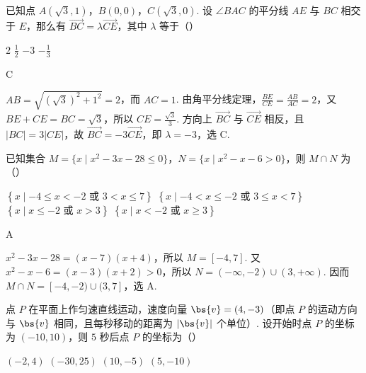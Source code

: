 \begin{problem}
已知点 \(A(\sqrt{3}, 1)\)，\(B(0, 0)\)，\(C(\sqrt{3}, 0)\). 设 \(\angle BAC\) 的平分线 \(AE\) 与 \(BC\) 相交于 \(E\)，那么有 \(\overrightarrow{BC} = \lambda \overrightarrow{CE}\)，其中 \(\lambda\) 等于（\quad）

\choices
    {\(2\)}
    {\(\frac{1}{2}\)}
    {\(-3\)}
    {\(-\frac{1}{3}\)}
\end{problem}

\begin{answer}
C
\end{answer}

\begin{solution}
\(AB=\sqrt{(\sqrt{3})^2+1^2}=2\)，而 \(AC=1\). 由角平分线定理，\(\frac{BE}{CE}=\frac{AB}{AC}=2\)，又 \(BE+CE=BC=\sqrt{3}\)，所以 \(CE=\frac{\sqrt{3}}{3}\). 方向上 \(\overrightarrow{BC}\) 与 \(\overrightarrow{CE}\) 相反，且 \(\lvert BC\rvert=3\lvert CE\rvert\)，故 \(\overrightarrow{BC}=-3\overrightarrow{CE}\)，即 \(\lambda=-3\)，选 C.
\end{solution}

\begin{problem}
已知集合 \(M = \{x \mid x^2 - 3x - 28 \leqslant 0\}\)，\(N = \{x \mid x^2 - x - 6 > 0\}\)，则 \(M \cap N\) 为（\quad）

\choices
    {\(\left\{x\mid -4\leqslant x < -2\text{\ 或\ }3 < x\leqslant 7\right\}\)}
    {\(\left\{x\mid -4 < x\leqslant -2\text{\ 或\ }3\leqslant x < 7\right\}\)}
    {\(\left\{x\mid x\leqslant -2\text{\ 或\ }x > 3\right\}\)}
   {\(\left\{x\mid x < -2\text{\ 或\ }x\geqslant 3\right\}\)}
\end{problem}

\begin{answer}
A
\end{answer}

\begin{solution}
\(x^2-3x-28=(x-7)(x+4)\)，所以 \(M=[-4,7]\). 又 \(x^2-x-6=(x-3)(x+2)>0\)，所以 \(N=(-\infty,-2)\cup(3,+\infty)\). 因而 \(M\cap N=[-4,-2)\cup(3,7]\)，选 A.
\end{solution}

\begin{problem}
点 \(P\) 在平面上作匀速直线运动，速度向量 \(\bs{v}=(4,-3)\)（即点 \(P\) 的运动方向与 \(\bs{v}\) 相同，且每秒移动的距离为 \(|\bs{v}|\) 个单位）. 设开始时点 \(P\) 的坐标为 \((-10,10)\)，则 \(5\) 秒后点 \(P\) 的坐标为（\quad）

\choices
    {\((-2, 4)\)}
    {\((-30, 25)\)}
    {\((10, -5)\)}
    {\((5, -10)\)}
\end{problem}

